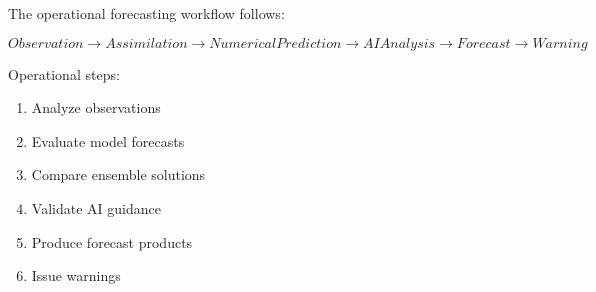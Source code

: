 The operational forecasting workflow follows:


\begin{equation}
Observation
\rightarrow
Assimilation
\rightarrow
Numerical Prediction
\rightarrow
AI Analysis
\rightarrow
Forecast
\rightarrow
Warning
\end{equation}



Operational steps:

\begin{enumerate}

\item Analyze observations

\item Evaluate model forecasts

\item Compare ensemble solutions

\item Validate AI guidance

\item Produce forecast products

\item Issue warnings

\end{enumerate}
